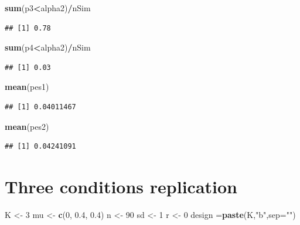 \documentclass[]{book}
\newenvironment{Shaded}{\begin{snugshade}}{\end{snugshade}}
\newcommand{\DataTypeTok}[1]{\textcolor[rgb]{0.13,0.29,0.53}{#1}}
\newcommand{\DecValTok}[1]{\textcolor[rgb]{0.00,0.00,0.81}{#1}}
\newcommand{\FloatTok}[1]{\textcolor[rgb]{0.00,0.00,0.81}{#1}}
\newcommand{\KeywordTok}[1]{\textcolor[rgb]{0.13,0.29,0.53}{\textbf{#1}}}
\newcommand{\NormalTok}[1]{#1}
\newcommand{\OperatorTok}[1]{\textcolor[rgb]{0.81,0.36,0.00}{\textbf{#1}}}
\newcommand{\StringTok}[1]{\textcolor[rgb]{0.31,0.60,0.02}{#1}}
\begin{document}
\begin{Shaded}
\begin{Highlighting}[]
\KeywordTok{sum}\NormalTok{(p3}\OperatorTok{<}\NormalTok{alpha2)}\OperatorTok{/}\NormalTok{nSim}
\end{Highlighting}
\end{Shaded}

\begin{verbatim}
## [1] 0.78
\end{verbatim}

\begin{Shaded}
\begin{Highlighting}[]
\KeywordTok{sum}\NormalTok{(p4}\OperatorTok{<}\NormalTok{alpha2)}\OperatorTok{/}\NormalTok{nSim}
\end{Highlighting}
\end{Shaded}

\begin{verbatim}
## [1] 0.03
\end{verbatim}

\begin{Shaded}
\begin{Highlighting}[]
\KeywordTok{mean}\NormalTok{(pes1)}
\end{Highlighting}
\end{Shaded}

\begin{verbatim}
## [1] 0.04011467
\end{verbatim}

\begin{Shaded}
\begin{Highlighting}[]
\KeywordTok{mean}\NormalTok{(pes2)}
\end{Highlighting}
\end{Shaded}

\begin{verbatim}
## [1] 0.04241091
\end{verbatim}

\hypertarget{three-conditions-replication}{%
\section{Three conditions replication}\label{three-conditions-replication}}

\begin{Shaded}
\begin{Highlighting}[]
\NormalTok{K <-}\StringTok{ }\DecValTok{3}
\NormalTok{mu <-}\StringTok{ }\KeywordTok{c}\NormalTok{(}\DecValTok{0}\NormalTok{, }\FloatTok{0.4}\NormalTok{, }\FloatTok{0.4}\NormalTok{)}
\NormalTok{n <-}\StringTok{ }\DecValTok{90}
\NormalTok{sd <-}\StringTok{ }\DecValTok{1}
\NormalTok{r <-}\StringTok{ }\DecValTok{0}
\NormalTok{design =}\KeywordTok{paste}\NormalTok{(K,}\StringTok{"b"}\NormalTok{,}\DataTypeTok{sep=}\StringTok{""}\NormalTok{)}
\end{Highlighting}
\end{Shaded}
\end{document}
